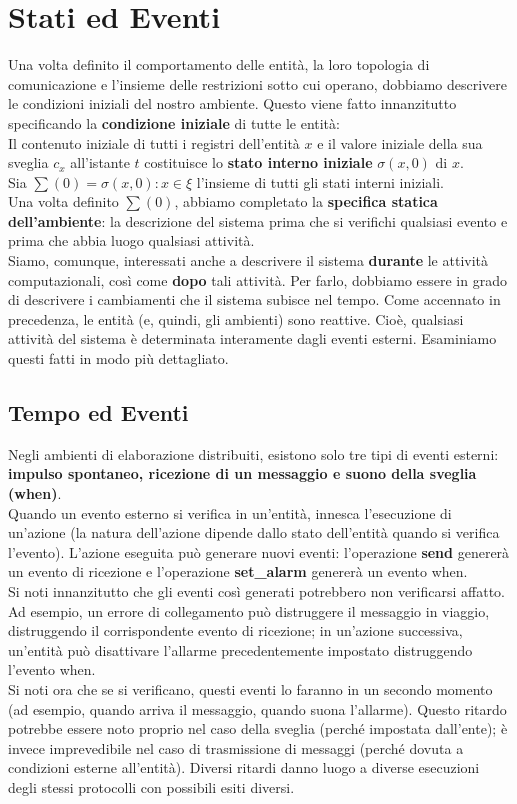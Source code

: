 \section{Stati ed Eventi}
Una volta definito il comportamento delle entità, la loro topologia di
comunicazione e l'insieme delle restrizioni sotto cui operano, dobbiamo
descrivere le condizioni iniziali del nostro ambiente. Questo viene fatto
innanzitutto specificando la \textbf{condizione iniziale} di tutte le entità:\\
Il contenuto iniziale di tutti i registri dell'entità $x$ e il valore iniziale
della sua sveglia $c_x$ all'istante $t$ costituisce lo \textbf{stato interno
    iniziale} $\sigma (x, 0)$ di $x$.\\
Sia $\sum(0) = {\sigma (x, 0) : x \in \xi}$ l'insieme di tutti gli stati interni
iniziali.\\
Una volta definito $\sum(0)$, abbiamo completato la \textbf{specifica statica
    dell'ambiente}: la descrizione del sistema prima che si verifichi qualsiasi
evento e prima che abbia luogo qualsiasi attività.\\
Siamo, comunque, interessati anche a descrivere il sistema \textbf{durante} le
attività computazionali, così come \textbf{dopo} tali attività. Per farlo,
dobbiamo essere in grado di descrivere i cambiamenti che il sistema subisce nel
tempo. Come accennato in precedenza, le entità (e, quindi, gli ambienti) sono
reattive. Cioè, qualsiasi attività del sistema è determinata interamente dagli
eventi esterni. Esaminiamo questi fatti in modo più dettagliato.

\subsection{Tempo ed Eventi}
Negli ambienti di elaborazione distribuiti, esistono solo tre tipi di eventi
esterni: \textbf{impulso spontaneo, ricezione di un messaggio e suono della
    sveglia (when)}.\\
Quando un evento esterno si verifica in un'entità, innesca l'esecuzione di
un'azione (la natura dell'azione dipende dallo stato dell'entità quando si
verifica l'evento). L'azione eseguita può generare nuovi eventi: l'operazione
\textbf{send} genererà un evento di ricezione e l'operazione \textbf{set\_alarm}
genererà un evento when.\\
Si noti innanzitutto che gli eventi così generati potrebbero non verificarsi
affatto. Ad esempio, un errore di collegamento può distruggere il messaggio in
viaggio, distruggendo il corrispondente evento di ricezione; in un'azione
successiva, un'entità può disattivare l'allarme precedentemente impostato
distruggendo l'evento when.\\
Si noti ora che se si verificano, questi eventi lo faranno in un secondo momento
(ad esempio, quando arriva il messaggio, quando suona l'allarme). Questo ritardo
potrebbe essere noto proprio nel caso della sveglia (perché impostata
dall'ente); è invece imprevedibile nel caso di trasmissione di messaggi (perché
dovuta a condizioni esterne all'entità). Diversi ritardi danno luogo a diverse
esecuzioni degli stessi protocolli con possibili esiti diversi.

